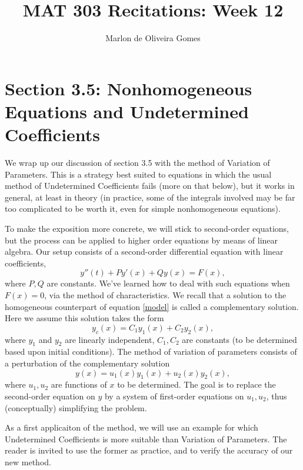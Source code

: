 \documentclass[11pt]{amsart}
\title{MAT 303 Recitations: Week 12}
\author[M. Gomes]{Marlon de Oliveira Gomes}
\numberwithin{equation}{section}
\begin{document}
\maketitle


\section*{Section 3.5: Nonhomogeneous Equations and Undetermined Coefficients}

We wrap up our discussion of section 3.5 with the method of Variation of Parameters. This is a strategy best suited to equations in which the usual method of Undetermined Coefficients fails (more on that below), but it works in general, at least in theory (in practice, some of the integrals involved may be far too complicated to be worth it, even for simple nonhomogeneous equations).

To make the exposition more concrete, we will stick to second-order equations, but the process can be applied to higher order equations by means of linear algebra. Our setup consists of a second-order differential equation with linear coefficients, 
\begin{equation}\label{model}
y''(t)+Py'(x)+Qy(x) = F(x),
\end{equation}
where $P,Q$ are constants. We've learned how to deal with such equations when $F(x)=0$, via the method of characteristics. We recall that a solution to the homogeneous counterpart of equation \eqref{model} is called a complementary solution. Here we assume this solution takes the form
\begin{equation*}
y_c(x)=C_1y_1(x)+C_2y_2(x),
\end{equation*}
where $y_1$ and $y_2$ are linearly independent, $C_1,C_2$ are constants (to be determined based upon initial conditions). The method of variation of parameters consists of a perturbation of the complementary solution
\begin{equation}\label{guess}
y(x)=u_1(x)y_1(x)+u_2(x)y_2(x),
\end{equation}
where $u_1, u_2$ are functions of $x$ to be determined. The goal is to replace the second-order equation on $y$ by a system of first-order equations on $u_1,u_2$, thus (conceptually) simplifying the problem.

As a first applicaiton of the method, we will use an example for which Undetermined Coefficients is more suitable than Variation of Parameters. The reader is invited to use the former as practice, and to verify the accuracy of our new method. 
\end{document}
